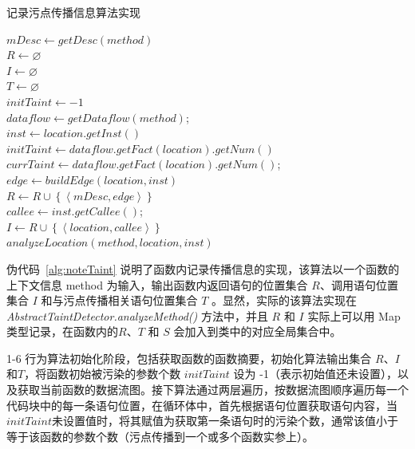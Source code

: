 \begin{algorithm}[!htb]\footnotesize
\caption{记录污点传播信息算法实现}
\label{alg:noteTaint}
$mDesc \leftarrow getDesc(method)$\\
$R \leftarrow \varnothing $\\
$I \leftarrow \varnothing $\\
$T \leftarrow \varnothing $\\
$initTaint \leftarrow -1$\\
$dataflow \leftarrow getDataflow(method)$;\\
 {
     {
        $inst \leftarrow location.getInst()$\\
         {
            $initTaint \leftarrow dataflow.getFact(location).getNum()$\\
        }
         {
            $currTaint \leftarrow dataflow.getFact(location).getNum()$;\\
             {
                $edge \leftarrow buildEdge(location, inst)$\\
                $R \leftarrow R \cup \left\{ \left\langle mDesc, edge \right\rangle \right\}$\\
            }
        }
         {
            $callee \leftarrow inst.getCallee()$;\\
            $I \leftarrow R \cup \left\{ \left\langle location, callee \right\rangle \right\}$\\
            $analyzeLocation(method, location, inst)$\\
        }
    }
}
\end{algorithm}

伪代码~\ref{alg:noteTaint} 说明了函数内记录传播信息的实现，该算法以一个函数的上下文信息 method 为输入，输出函数内返回语句的位置集合 $R$、调用语句位置集合 $I$ 和与污点传播相关语句位置集合 $T$ 。显然，实际的该算法实现在 \textit{AbstractTaintDetector.analyzeMethod()} 方法中，并且 $R$ 和 $I$ 实际上可以用 Map 类型记录，在函数内的$R$、$T$ 和 $S$ 会加入到类中的对应全局集合中。

1-6 行为算法初始化阶段，包括获取函数的函数摘要，初始化算法输出集合 $R$、$I$和$T$，将函数初始被污染的参数个数 $initTaint$ 设为 -1（表示初始值还未设置），以及获取当前函数的数据流图。接下算法通过两层遍历，按数据流图顺序遍历每一个代码块中的每一条语句位置，在循环体中，首先根据语句位置获取语句内容，当$initTaint$未设置值时，将其赋值为获取第一条语句时的污染个数，通常该值小于等于该函数的参数个数（污点传播到一个或多个函数实参上）。

